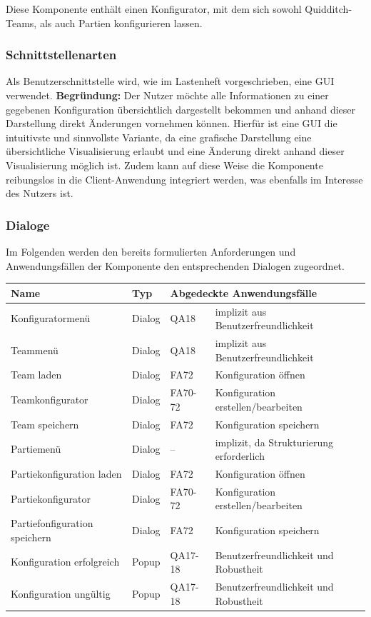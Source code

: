 \documentclass[a4paper,12pt,
headsepline,           %
oneside,               %
pointlessnumbers,      %
bibtotoc,              %
]{scrartcl}
\begin{document}
    Diese Komponente enthält einen Konfigurator, mit dem sich sowohl Quidditch-Teams, als auch Partien konfigurieren lassen.
	
	\subsubsection{Schnittstellenarten}
	
	Als Benutzerschnittstelle wird, wie im Lastenheft vorgeschrieben, eine GUI verwendet. \textbf{Begründung:} Der Nutzer möchte alle Informationen zu einer gegebenen Konfiguration übersichtlich dargestellt bekommen und anhand dieser Darstellung direkt Änderungen vornehmen können. Hierfür ist eine GUI die intuitivste und sinnvollste Variante, da eine grafische Darstellung eine übersichtliche Visualisierung erlaubt und eine Änderung direkt anhand dieser Visualisierung möglich ist. Zudem kann auf diese Weise die Komponente reibungslos in die Client-Anwendung integriert werden, was ebenfalls im Interesse des Nutzers ist.
	
	\subsubsection{Dialoge}
	
	Im Folgenden werden den bereits formulierten Anforderungen und Anwendungsfällen der Komponente den entsprechenden Dialogen zugeordnet.
	
	\begin{tabular}{| l l l l |}
	\hline
	\textbf{Name} & \textbf{Typ} & \multicolumn{2}{l|}{\textbf{Abgedeckte Anwendungsfälle}} \\\hline
	Konfiguratormenü & Dialog & QA18 & implizit aus Benutzerfreundlichkeit\\\hline
	Teammenü & Dialog & QA18 & implizit aus Benutzerfreundlichkeit\\\hline
	Team laden & Dialog & FA72 & Konfiguration öffnen \\\hline
	Teamkonfigurator & Dialog & FA70-72 & Konfiguration erstellen/bearbeiten\\\hline
	Team speichern & Dialog & FA72 & Konfiguration speichern \\\hline
	Partiemenü & Dialog & – & implizit, da Strukturierung erforderlich\\\hline
	Partiekonfiguration laden & Dialog & FA72 & Konfiguration öffnen \\\hline
	Partiekonfigurator & Dialog & FA70-72 & Konfiguration erstellen/bearbeiten\\\hline
	Partiefonfiguration speichern & Dialog & FA72 & Konfiguration speichern \\\hline
	Konfiguration erfolgreich & Popup & QA17-18 & Benutzerfreundlichkeit und Robustheit\\\hline
	Konfiguration ungültig & Popup & QA17-18 & Benutzerfreundlichkeit und Robustheit\\\hline
		
	\end{tabular}
	
\end{document}
